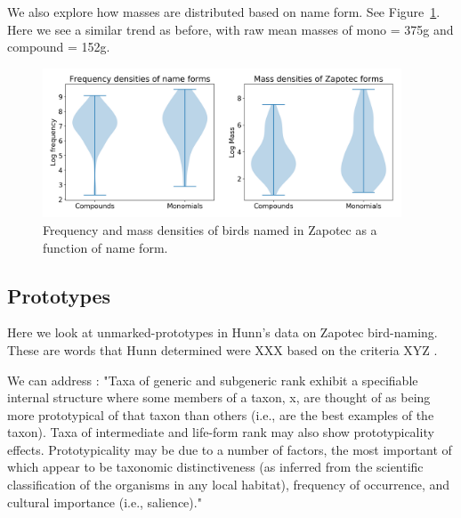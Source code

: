 \documentclass[10pt,letterpaper]{article}
\begin{document}
We also explore how masses are distributed based on name form. See Figure~\ref{fig-both-nameforms}. Here we see a similar trend as before, with raw mean masses of mono = 375g and compound = 152g.


\begin{figure}[ht!]
  \begin{center}
    \includegraphics[width=0.95\textwidth]{./figures/nameforms-both.png}
        \caption{Frequency and mass densities of birds named in Zapotec as a function of name form.}
        \label{fig-both-nameforms}
  \end{center}
\end{figure}

\subsection{Prototypes}

Here we look at unmarked-prototypes in Hunn's data on Zapotec bird-naming. These are words that Hunn determined were XXX based on the criteria XYZ \cite{hunn2008zapotec}.


We can address \cite{berlin2014ethnobiological}:
 "Taxa of generic and subgeneric rank exhibit a specifiable internal
structure where some members of a taxon, x, are thought of as being
more prototypical of that taxon than others (i.e., are the best
examples of the taxon). Taxa of intermediate and life-form rank may
also show prototypicality effects. Prototypicality may be due to a
number of factors, the most important of which appear to be taxonomic
distinctiveness (as inferred from the scientific classification of the
organisms in any local habitat), frequency of occurrence, and cultural
importance (i.e., salience)."
\end{document}
